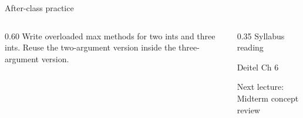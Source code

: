 \documentclass[10pt,aspectratio=169]{beamer}
\begin{document}
\begin{frame}[fragile,t]{After-class practice}
\begin{columns}[T,onlytextwidth]\begin{column}{0.60\textwidth}
Write overloaded max methods for two ints and three ints. Reuse the two-argument version inside the three-argument version.
\end{column}\begin{column}{0.35\textwidth}\small
Syllabus reading\par Deitel Ch 6

Next lecture: Midterm concept review
\end{column}\end{columns}
\end{frame}
\end{document}
